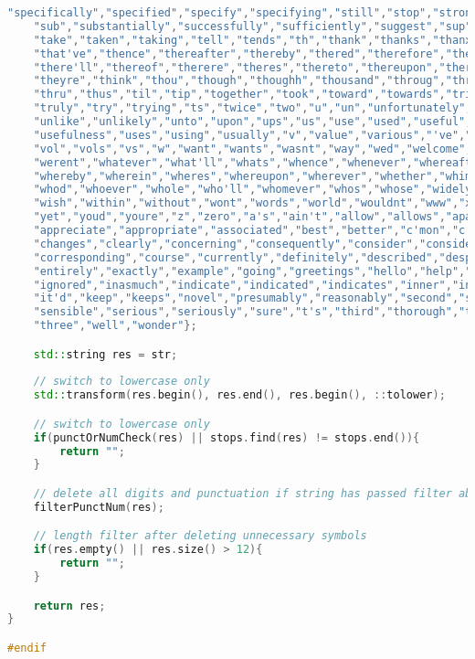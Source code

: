 \documentclass[12pt,a4paper]{scrartcl}
\begin{document}
\begin{lstlisting}[language=C++, basicstyle=\scriptsize]
    "specifically","specified","specify","specifying","still","stop","strongly",
    "sub","substantially","successfully","sufficiently","suggest","sup","sure",
    "take","taken","taking","tell","tends","th","thank","thanks","thanx","thats",
    "that've","thence","thereafter","thereby","thered","therefore","therein",
    "there'll","thereof","therere","theres","thereto","thereupon","there've","theyd",
    "theyre","think","thou","though","thoughh","thousand","throug","throughout",
    "thru","thus","til","tip","together","took","toward","towards","tried","tries",
    "truly","try","trying","ts","twice","two","u","un","unfortunately","unless",
    "unlike","unlikely","unto","upon","ups","us","use","used","useful","usefully",
    "usefulness","uses","using","usually","v","value","various","'ve","via","viz",
    "vol","vols","vs","w","want","wants","wasnt","way","wed","welcome","went",
    "werent","whatever","what'll","whats","whence","whenever","whereafter","whereas",
    "whereby","wherein","wheres","whereupon","wherever","whether","whim","whither",
    "whod","whoever","whole","who'll","whomever","whos","whose","widely","willing",
    "wish","within","without","wont","words","world","wouldnt","www","x","yes",
    "yet","youd","youre","z","zero","a's","ain't","allow","allows","apart","appear",
    "appreciate","appropriate","associated","best","better","c'mon","c's","cant",
    "changes","clearly","concerning","consequently","consider","considering",
    "corresponding","course","currently","definitely","described","despite",
    "entirely","exactly","example","going","greetings","hello","help","hopefully",
    "ignored","inasmuch","indicate","indicated","indicates","inner","insofar",
    "it'd","keep","keeps","novel","presumably","reasonably","second","secondly",
    "sensible","serious","seriously","sure","t's","third","thorough","thoroughly",
    "three","well","wonder"};

    std::string res = str;
    
    // switch to lowercase only
    std::transform(res.begin(), res.end(), res.begin(), ::tolower);

    // switch to lowercase only
    if(punctOrNumCheck(res) || stops.find(res) != stops.end()){
        return "";
    }

    // delete all digits and punctuation if string has passed filter above
    filterPunctNum(res);

    // length filter after deleting unnecessary symbols
    if(res.empty() || res.size() > 12){
        return "";
    }

    return res;
}

#endif

\end{lstlisting}
\end{document}
